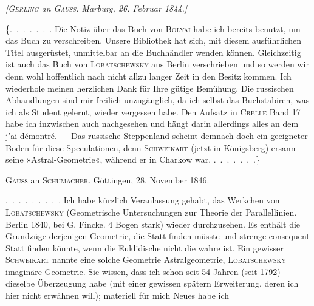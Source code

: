 %
\begin{center}\emph{[\textup{\textsc{Gerling}} an \textup{\textsc{Gauss}}. Marburg, 26. Februar 1844.]}\end{center}

\{\mbox{.\ .\ .\ .\ .\ .\ .} Die Notiz über das Buch von \textsc{Bolyai} habe ich bereits benutzt, um das Buch zu verschreiben. Unsere Bibliothek hat sich, mit diesem ausführlichen Titel ausgerüstet, unmittelbar an die Buchhändler wenden können. Gleichzeitig ist auch das Buch von \textsc{Lobatschewsky} aus Berlin verschrieben und so werden wir denn wohl hoffentlich nach nicht allzu langer Zeit in den Besitz kommen. Ich wiederhole meinen herzlichen Dank für Ihre gütige Bemühung. Die russischen Abhandlungen sind mir freilich unzugänglich, da ich selbst das Buchstabiren, was ich als Student gelernt, wieder vergessen habe. Den Aufsatz in \textsc{Crelle} Band 17 habe ich inzwischen auch nachgesehen und hängt darin allerdings alles an dem j'ai démontré. --- Das russische Steppenland scheint demnach doch ein geeigneter Boden für diese Speculationen, denn \textsc{Schweikart} (jetzt in Königsberg) ersann seine »Astral-Geometrie«, während er in Charkow war. \mbox{.\ .\ .\ .\ .\ .\ .}\}

\par\bigskip{}

\begin{center}\textsc{Gauss} an \textsc{Schumacher}. Göttingen, 28. November 1846.\end{center}

\mbox{.\ .\ .\ .\ .\ .\ .\ .\ .} Ich habe kürzlich Veranlassung gehabt, das Werkchen von \textsc{Lobatschewsky} (Geometrische Untersuchungen zur Theorie der Parallellinien. Berlin 1840, bei G. Fincke. 4 Bogen stark) wieder durchzusehen. Es enthält die Grundzüge derjenigen Geometrie, die Statt finden müsste und strenge consequent Statt finden könnte, wenn die Euklidische nicht die wahre ist. Ein gewisser \textsc{Schweikart} nannte eine solche Geometrie Astralgeometrie, \textsc{Lobatschewsky} imaginäre Geometrie. Sie wissen, dass ich schon seit 54 Jahren (seit 1792) dieselbe Überzeugung habe (mit einer gewissen spätern Erweiterung, deren ich hier nicht erwähnen will); materiell für mich Neues habe ich
